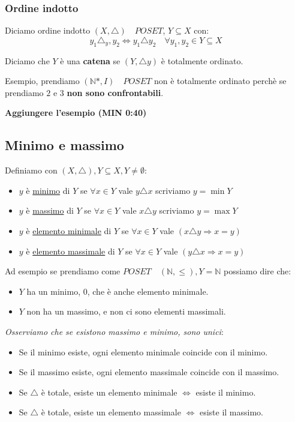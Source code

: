 \documentclass{article}
\begin{document}
\subsubsection{Ordine indotto}
Diciamo ordine indotto $(X, \triangle) \quad POSET$, $ Y \subseteq X$ con:
\begin{equation*}
        y_1 \triangle_y,y_2 \Leftrightarrow y_1 \triangle y_2 \quad \forall y_1,y_2 \in Y \subseteq X
\end{equation*}

Diciamo che $Y$ è una \textbf{catena} se $(Y, \triangle y)$ è totalmente ordinato. \par

Esempio, prendiamo $(\mathbb{N}*, I) \quad POSET$ non è totalmente ordinato perchè se prendiamo $2$ e $3$ \textbf{non sono confrontabili}. \par
\textbf{Aggiungere l'esempio (MIN 0:40)}



\subsection{Minimo e massimo}
Definiamo con $(X, \triangle), Y \subseteq X, Y \not = \emptyset$:
\begin{itemize}
        \item $y$ è \underline{minimo} di $Y$ se $\forall x \in Y$  vale $y \triangle x$ scriviamo $y = \min Y$
        \item $y$ è \underline{massimo} di $Y$ se $\forall x \in Y$  vale $x \triangle y$ scriviamo $y = \max Y$
        \item $y$ è \underline{elemento minimale} di $Y$ se $\forall x \in Y$  vale $(x \triangle y \Rightarrow x = y)$
        \item $y$ è \underline{elemento massimale} di $Y$ se $\forall x \in Y$  vale $(y \triangle x \Rightarrow x = y)$
\end{itemize}

Ad esempio se prendiamo come $POSET \quad (\mathbb{N}, \le), Y = \mathbb{N}$ possiamo dire che:
\begin{itemize}
        \item $Y$ ha un minimo, $0$, che è anche elemento minimale.
        \item $Y$ non ha un massimo, e non ci sono elementi massimali. 
\end{itemize}

\textit{Osserviamo che se esistono massimo e minimo, sono unici}:
\begin{itemize}
        \item Se il minimo esiste, ogni elemento minimale coincide con il minimo.
        \item Se il massimo esiste, ogni elemento massimale coincide con il massimo.
        \item Se $\triangle$ è totale, esiste un elemento minimale $\Leftrightarrow$ esiste il minimo.
        \item Se $\triangle$ è totale, esiste un elemento massimale $\Leftrightarrow$ esiste il massimo. 
\end{itemize}
\end{document}
